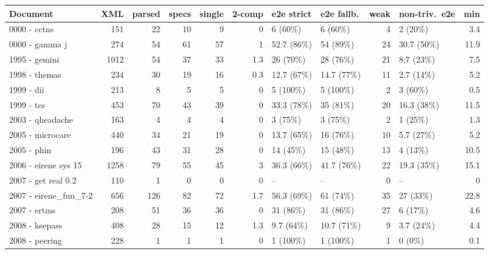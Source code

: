 \documentclass[10pt,a4paper]{article}
\begin{document}
\begin{table}[h]
\centering\small
\setlength{\tabcolsep}{4pt}
\begin{tabular}{@{}lrrrrrllrlr@{}}
\toprule
Document & XML & parsed & specs & single & 2-comp & e2e strict & e2e fallb. & weak & non-triv.\ e2e & min \\
\midrule
0000 - cctns           & 151  & 22  & 10 & 9  & 0   & 6 (60\%)     & 6 (60\%)     & 4  & 2 (20\%)    & 3.4 \\
0000 - gamma j         & 274  & 54  & 61 & 57 & 1   & 52.7 (86\%)  & 54 (89\%)    & 24 & 30.7 (50\%) & 11.9 \\
1995 - gemini          & 1012 & 54  & 37 & 33 & 1.3 & 26 (70\%)    & 28 (76\%)    & 21 & 8.7 (23\%)  & 7.5 \\
1998 - themas          & 234  & 30  & 19 & 16 & 0.3 & 12.7 (67\%)  & 14.7 (77\%)  & 11 & 2.7 (14\%)  & 5.2 \\
1999 - dii             & 213  & 8   & 5  & 5  & 0   & 5 (100\%)    & 5 (100\%)    & 2  & 3 (60\%)    & 0.5 \\
1999 - tcs             & 453  & 70  & 43 & 39 & 0   & 33.3 (78\%)  & 35 (81\%)    & 20 & 16.3 (38\%) & 11.5 \\
2003 - qheadache       & 163  & 4   & 4  & 4  & 0   & 3 (75\%)     & 3 (75\%)     & 2  & 1 (25\%)    & 1.3 \\
2005 - microcare       & 440  & 34  & 21 & 19 & 0   & 13.7 (65\%)  & 16 (76\%)    & 10 & 5.7 (27\%)  & 5.2 \\
2005 - phin            & 196  & 43  & 31 & 28 & 0   & 14 (45\%)    & 15 (48\%)    & 13 & 4 (13\%)    & 10.5 \\
2006 - eirene sys 15   & 1258 & 79  & 55 & 45 & 3   & 36.3 (66\%)  & 41.7 (76\%)  & 22 & 19.3 (35\%) & 15.1 \\
2007 - get real 0.2    & 110  & 1   & 0  & 0  & 0   & --           & --           & 0  & --          & 0 \\
2007 - eirene\_fun\_7-2 & 656 & 126 & 82 & 72 & 1.7 & 56.3 (69\%)  & 61 (74\%)    & 35 & 27 (33\%)   & 22.8 \\
2007 - ertms           & 208  & 51  & 36 & 36 & 0   & 31 (86\%)    & 31 (86\%)    & 27 & 6 (17\%)    & 4.6 \\
2008 - keepass         & 408  & 28  & 15 & 12 & 1.3 & 9.7 (64\%)   & 10.7 (71\%)  & 9  & 3.7 (24\%)  & 4.4 \\
2008 - peering         & 228  & 1   & 1  & 1  & 0   & 1 (100\%)    & 1 (100\%)    & 1  & 0 (0\%)     & 0.1 \\

\end{tabular}
\end{table}
\end{document}
